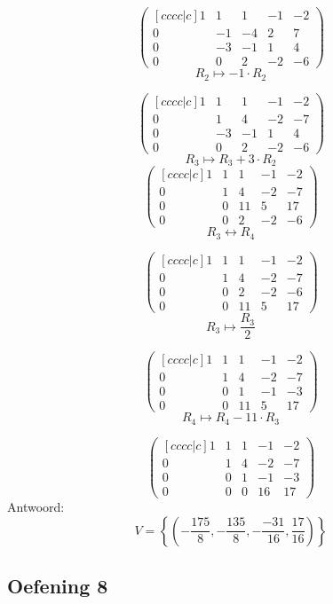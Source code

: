 \documentclass[lineaire_algebra_oplossingen.tex]{subfiles}
\begin{document}
\[
\begin{pmatrix}[cccc|c]
1 & 1 & 1 & -1 & -2\\
0 & -1 & -4 & 2 & 7\\
0 & -3 & -1 & 1 & 4\\
0 & 0 & 2 & -2 & -6
\end{pmatrix}
\]
\[ R_2 \longmapsto  -1\cdot R_2\]

\[
\begin{pmatrix}[cccc|c]
1 & 1 & 1 & -1 & -2\\
0 & 1 & 4 & -2 & -7\\
0 & -3 & -1 & 1 & 4\\
0 & 0 & 2 & -2 & -6
\end{pmatrix}
\]
\[ R_3 \longmapsto R_3 + 3\cdot R_2\]
\[
\begin{pmatrix}[cccc|c]
1 & 1 & 1 & -1 & -2\\
0 & 1 & 4 & -2 & -7\\
0 & 0 & 11 & 5 & 17\\
0 & 0 & 2 & -2 & -6
\end{pmatrix}
\]
\[ R_3 \leftrightarrow R_4\]

\[
\begin{pmatrix}[cccc|c]
1 & 1 & 1 & -1 & -2\\
0 & 1 & 4 & -2 & -7\\
0 & 0 & 2 & -2 & -6\\
0 & 0 & 11 & 5 & 17
\end{pmatrix}
\]
\[ R_3 \longmapsto  \frac{R_3}{2}
\]

\[
\begin{pmatrix}[cccc|c]
1 & 1 & 1 & -1 & -2\\
0 & 1 & 4 & -2 & -7\\
0 & 0 & 1 & -1 & -3\\
0 & 0 & 11 & 5 & 17
\end{pmatrix}
\]
\[ R_4 \longmapsto R_4 - 11\cdot R_3\]

\[
\begin{pmatrix}[cccc|c]
1 & 1 & 1 & -1 & -2\\
0 & 1 & 4 & -2 & -7\\
0 & 0 & 1 & -1 & -3\\
0 & 0 & 0 & 16 & 17
\end{pmatrix}
\]
Antwoord:
\[
V = \left\{\left( -\frac{175}{8},-\frac{135}{8}, -\frac{-31}{16}, \frac{17}{16} \right)\right\}
\]
\subsection{Oefening 8}
\end{document}
